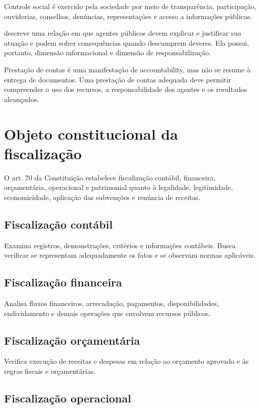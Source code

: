 Controle social é exercido pela sociedade por meio de transparência, participação, ouvidorias, conselhos, denúncias, representações e acesso a informações públicas.

 descreve uma relação em que agentes públicos devem explicar e justificar sua atuação e podem sofrer consequências quando descumprem deveres. Ela possui, portanto, dimensão informacional e dimensão de responsabilização.

Prestação de contas é uma manifestação de accountability, mas não se resume à entrega de documentos. Uma prestação de contas adequada deve permitir compreender o uso dos recursos, a responsabilidade dos agentes e os resultados alcançados.

\section{Objeto constitucional da fiscalização}

O art. 70 da Constituição estabelece fiscalização contábil, financeira, orçamentária, operacional e patrimonial quanto à legalidade, legitimidade, economicidade, aplicação das subvenções e renúncia de receitas.

\subsection{Fiscalização contábil}

Examina registros, demonstrações, critérios e informações contábeis. Busca verificar se representam adequadamente os fatos e se observam normas aplicáveis.

\subsection{Fiscalização financeira}

Analisa fluxos financeiros, arrecadação, pagamentos, disponibilidades, endividamento e demais operações que envolvem recursos públicos.

\subsection{Fiscalização orçamentária}

Verifica execução de receitas e despesas em relação ao orçamento aprovado e às regras fiscais e orçamentárias.

\subsection{Fiscalização operacional}

